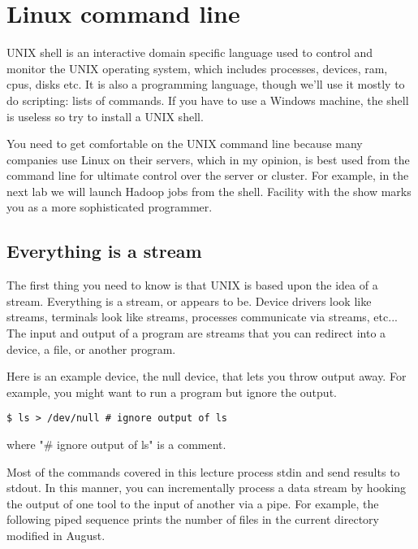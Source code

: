 \chapter{Linux command line}

\setcounter{problem}{1}

\begin{fullwidth}

UNIX shell is an interactive domain specific language used to control and monitor the UNIX operating system, which includes processes, devices, ram, cpus, disks etc.   It is also a programming language, though we'll use it mostly to do scripting: lists of commands. If you have to use a Windows machine, the shell is useless so try to install a UNIX shell.

You need to get comfortable on the UNIX command line because many companies use Linux on their servers, which in my opinion, is best used from the command line for ultimate control over the server or cluster. For example, in the next lab we will launch Hadoop jobs from the shell.  Facility with the show marks you as a more sophisticated programmer.

\section{Everything is a stream}

The first thing you need to know is that UNIX is based upon the idea of a stream. Everything is a stream, or appears to be. Device drivers look like streams, terminals look like streams, processes communicate via streams, etc... The input and output of a program are streams that you can redirect into a device, a file, or another program.

Here is an example device, the null device, that lets you throw output away. For example, you might want to run a program but ignore the output.

\begin{lstlisting}[style=BashInputStyle]
$ ls > /dev/null # ignore output of ls
\end{lstlisting}

\noindent where "\# ignore output of ls" is a comment.

Most of the commands covered in this lecture process stdin and send results to stdout. In this manner, you can incrementally process a data stream by hooking the output of one tool to the input of another via a pipe. For example, the following piped sequence prints the number of files in the current directory modified in August.


\end{fullwidth}
